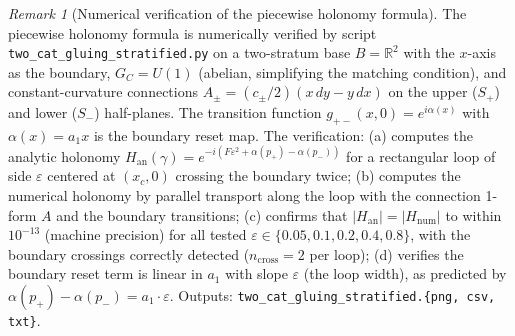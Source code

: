 \documentclass[11pt,a4paper]{article}
\theoremstyle{plain}
\theoremstyle{definition}
\theoremstyle{remark}
\newtheorem{remark}[theorem]{Remark}
\newcommand{\RR}{\mathbb{R}}
\begin{document}
\begin{remark}[Numerical verification of the piecewise holonomy formula]
\label{rem:2cat-gluing-numeric}
The piecewise holonomy formula is numerically verified by script
\texttt{two\_cat\_gluing\_stratified.py} on a two-stratum base
$B = \RR^2$ with the $x$-axis as the boundary, $G_C = U(1)$ (abelian,
simplifying the matching condition), and constant-curvature connections
$A_\pm = (c_\pm/2)(x\,dy - y\,dx)$ on the upper ($S_+$) and lower
($S_-$) half-planes. The transition function $g_{+-}(x, 0) = e^{i \alpha(x)}$
with $\alpha(x) = a_1 x$ is the boundary reset map. The verification:
(a) computes the analytic holonomy $H_{\mathrm{an}}(\gamma) =
e^{-i(F \varepsilon^2 + \alpha(p_+) - \alpha(p_-))}$ for a rectangular
loop of side $\varepsilon$ centered at $(x_c, 0)$ crossing the boundary
twice; (b) computes the numerical holonomy by parallel transport along
the loop with the connection 1-form $A$ and the boundary transitions;
(c) confirms that $|H_{\mathrm{an}}| = |H_{\mathrm{num}}|$ to within
$10^{-13}$ (machine precision) for all tested $\varepsilon \in \{0.05,
0.1, 0.2, 0.4, 0.8\}$, with the boundary crossings correctly detected
($n_{\mathrm{cross}} = 2$ per loop); (d) verifies the boundary reset
term is linear in $a_1$ with slope $\varepsilon$ (the loop width), as
predicted by $\alpha(p_+) - \alpha(p_-) = a_1 \cdot \varepsilon$. Outputs:
\texttt{two\_cat\_gluing\_stratified.\{png, csv, txt\}}.
\end{remark}
\end{document}
